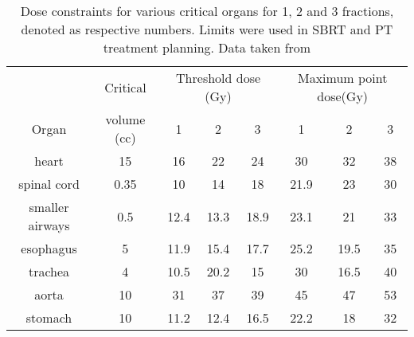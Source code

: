 \documentclass[type=dr, dr=rernat, accentcolor=tud7b,colorbacktitle, bigchapter, openright, twoside, 12pt ]{tudthesis}
\begin{document}
\begin{table}[H]
  \centering
  \caption{Dose constraints for various critical organs for 1, 2 and 3 fractions, denoted as respective numbers. Limits were used in SBRT and PT treatment planning. Data taken from \cite{Benedict2010}}
  \begin{tabular}{c|c|c|c|c|c|c|c}
   & Critical  & \multicolumn{3}{c}{Threshold dose (Gy)} & \multicolumn{3}{|c}{Maximum point dose(Gy)}  \\
  Organ & volume (cc) & 1 & 2 & 3 & 1 & 2 & 3 \\
   \hline
   heart & 15 & 16 & 22 & 24 & 30 & 32 & 38\\
spinal cord & 0.35 & 10 & 14 & 18 & 21.9 & 23 & 30\\
smaller airways & 0.5 & 12.4 & 13.3 & 18.9 & 23.1 & 21 & 33\\
esophagus & 5 & 11.9 & 15.4 & 17.7 & 25.2 & 19.5 & 35\\
trachea & 4 & 10.5 & 20.2 & 15 & 30 & 16.5 & 40\\
aorta & 10 & 31 & 37 & 39 & 45 & 47 & 53\\
stomach & 10 & 11.2 & 12.4 & 16.5 & 22.2 & 18 & 32\\
\hline\hline
  
  \end{tabular}
  \label{tab:oarlimits}
\end{table}
  


{}
% 
\end{document}
